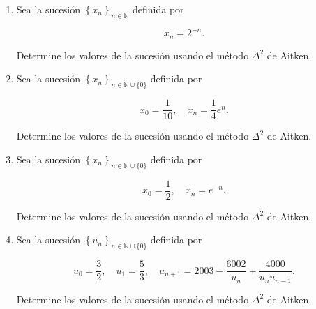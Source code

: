 \documentclass[
	spanish,
	8pt,
	utf8,
	xcolor=table,
	handout,
	aspectratio=169,
	professionalfonts,
	notheorems,
	mathserif,
]{beamer}
\newcounter{savedenum}
\newcommand*{\saveenum}{\setcounter{savedenum}{\theenumi}}
\newcommand*{\resume}{\setcounter{enumi}{\thesavedenum}}
\begin{document}
\begin{frame}
	\begin{enumerate}
		\resume

		\item

		      Sea la sucesión $\left\{x_{n}\right\}_{n\in\mathbb{N}}$
		      definida por

		      \begin{equation*}
			      x_{n}=2^{-n}.
		      \end{equation*}

		      Determine los valores de la sucesión usando el método
		      $\Delta^{2}$ de Aitken.

		\item

		      Sea la sucesión
		      $\left\{x_{n}\right\}_{n\in\mathbb{N}\cup\{0\}}$ definida
		      por

		      \begin{equation*}
			      x_{0}=\frac{1}{10},\quad
			      x_{n}=\frac{1}{4}e^{n}.
		      \end{equation*}

		      Determine los valores de la sucesión usando el método
		      $\Delta^{2}$ de Aitken.

		\item

		      Sea la sucesión
		      $\left\{x_{n}\right\}_{n\in\mathbb{N}\cup\{0\}}$ definida
		      por

		      \begin{equation*}
			      x_{0}=\frac{1}{2},\quad
			      x_{n}=e^{-n}.
		      \end{equation*}

		      Determine los valores de la sucesión usando el método
		      $\Delta^{2}$ de Aitken.

		\item

		      Sea la sucesión
		      $\left\{u_{n}\right\}_{n\in\mathbb{N}\cup\{0\}}$ definida
		      por

		      \begin{equation*}
			      u_{0}=\frac{3}{2},\quad
			      u_{1}=\frac{5}{3},\quad
			      u_{n+1}=2003-\frac{6002}{u_{n}}+\frac{4000}{u_{n}u_{n-1}}.
		      \end{equation*}

		      Determine los valores de la sucesión usando el método
		      $\Delta^2$ de Aitken.

		      \saveenum
	\end{enumerate}
\end{frame}
\end{document}
